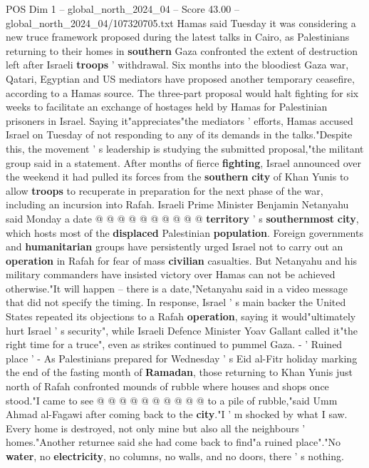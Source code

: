 \begin{textsample}{POS Dim 1 – global\_north\_2024\_04 – Score 43.00 – global\_north\_2024\_04/107320705.txt}  \label{ex:f1_pos_192}
Hamas said Tuesday it was considering a new truce framework proposed during the latest talks in Cairo, as Palestinians returning to their homes in \textbf{southern} Gaza confronted the extent of destruction left after Israeli \textbf{troops} ' withdrawal.
Six months into the bloodiest Gaza war, Qatari, Egyptian and US mediators have proposed another temporary ceasefire, according to a Hamas source.
The three-part proposal would halt fighting for six weeks to facilitate an exchange of hostages held by Hamas for Palestinian prisoners in Israel.
Saying it"appreciates"the mediators ' efforts, Hamas accused Israel on Tuesday of not responding to any of its demands in the talks."Despite this, the movement ' s leadership is studying the submitted proposal,"the militant group said in a statement.
After months of fierce \textbf{fighting}, Israel announced over the weekend it had pulled its forces from the \textbf{southern} \textbf{city} of Khan Yunis to allow \textbf{troops} to recuperate in preparation for the next phase of the war, including an incursion into Rafah.
Israeli Prime Minister Benjamin Netanyahu said Monday a date @ @ @ @ @ @ @ @ @ @ \textbf{territory} ' s \textbf{southernmost} \textbf{city}, which hosts most of the \textbf{displaced} Palestinian \textbf{population}.
Foreign governments and \textbf{humanitarian} groups have persistently urged Israel not to carry out an \textbf{operation} in Rafah for fear of mass \textbf{civilian} casualties.
But Netanyahu and his military commanders have insisted victory over Hamas can not be achieved otherwise."It will happen -- there is a date,"Netanyahu said in a video message that did not specify the timing.
In response, Israel ' s main backer the United States repeated its objections to a Rafah \textbf{operation}, saying it would"ultimately hurt Israel ' s security", while Israeli Defence Minister Yoav Gallant called it"the right time for a truce", even as strikes continued to pummel Gaza. - ' Ruined place ' - As Palestinians prepared for Wednesday ' s Eid al-Fitr holiday marking the end of the fasting month of \textbf{Ramadan}, those returning to Khan Yunis just north of Rafah confronted mounds of rubble where houses and shops once stood."I came to see @ @ @ @ @ @ @ @ @ @ to a pile of rubble,"said Umm Ahmad al-Fagawi after coming back to the \textbf{city}."I ' m shocked by what I saw.
Every home is destroyed, not only mine but also all the neighbours ' homes."Another returnee said she had come back to find"a ruined place"."No \textbf{water}, no \textbf{electricity}, no columns, no walls, and no doors, there ' s nothing.

\end{textsample}
